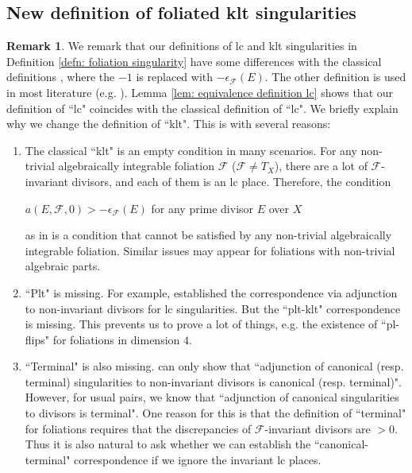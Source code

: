 \documentclass[11pt]{amsart}
\numberwithin{equation}{section}
\newcommand{\Ff}{\mathcal{F}}
\theoremstyle{definition}
\theoremstyle{definition}
\newtheorem{rem}[thm]{Remark}
\theoremstyle{definition}
\begin{document}
\subsection{New definition of foliated klt singularities} \begin{rem}\label{rem: new definition klt}
       We remark that our definitions of lc and klt singularities in Definition \ref{defn: foliation singularity} have some differences with the classical definitions \cite[Definition I.1.5]{McQ08}, where the $-1$ is replaced with $-\epsilon_{\Ff}(E)$. The other definition is used in most literature (e.g. \cite{CS20,ACSS21,CS21,CHLX23}). Lemma \ref{lem: equivalence definition lc} shows that our definition of ``lc" coincides with the classical definition of ``lc". We briefly explain why we change the definition of ``klt". This is with several reasons:
       \begin{enumerate}
      \item  The classical ``klt" is an empty condition in many scenarios. For any non-trivial algebraically integrable foliation $\Ff$ ($\Ff\not=T_X$), there are a lot of $\Ff$-invariant divisors, and each of them is an lc place. Therefore, the condition
         \begin{center}
         $a(E,\Ff,0)>-\epsilon_{\Ff}(E)$ for any prime divisor $E$ over $X$
         \end{center}
         as in \cite[Definition I.1.5(3)]{McQ08} is a condition that cannot be satisfied by any non-trivial algebraically integrable foliation. Similar issues may appear for foliations with non-trivial algebraic parts.
         \item ``Plt" is missing. For example, \cite[Theorem 1.1]{CS23b} established the correspondence via adjunction to non-invariant divisors for lc singularities. But the ``plt-klt" correspondence is missing. This prevents us to prove a lot of things, e.g. the existence of ``pl-flips" for foliations in dimension $4$. 
         \item ``Terminal" is also missing. \cite[Theorems 1.1, 3.16]{CS23b} can only show that ``adjunction of canonical (resp. terminal) singularities to non-invariant divisors is canonical (resp. terminal)". However, for usual pairs, we know that ``adjunction of canonical singularities to divisors is terminal". One reason for this is that the definition of ``terminal" for foliations requires that the discrepancies of $\Ff$-invariant divisors are $>0$. Thus it is also natural to ask whether we can establish the ``canonical-terminal" correspondence if we ignore the invariant lc places.

\end{enumerate}
\end{rem}
\end{document}
